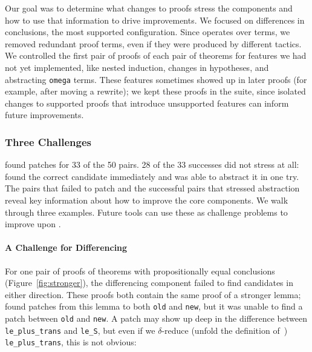 Our goal was to determine what changes to proofs stress the components
and how to use that information to drive improvements.
We focused on differences in conclusions, the most supported configuration.
Since \sysname operates over terms,
we removed redundant proof terms, even if they were produced by different tactics.
We controlled the first pair of proofs of each pair of theorems for features we had not yet implemented,
like nested induction, changes in hypotheses, and abstracting \lstinline{omega} terms.
These features sometimes showed up in later proofs (for example, after moving a rewrite);
we kept these proofs in the suite, since isolated changes to supported proofs that
introduce unsupported features can inform future improvements.	

\subsubsection{Three Challenges}
\label{sec:fail}

\sysname found patches for 33 of the 50 pairs. 28 of the 33 successes
did not stress \sysname at all: \sysname found the correct candidate immediately and was able to abstract it
in one try.
The pairs that \sysname failed to patch and the successful pairs that stressed abstraction
reveal key information about how to improve the core components.
We walk through three examples.
Future tools can use these as challenge problems to improve upon \sysname.

\paragraph{A Challenge for Differencing} For one pair of proofs of theorems 
with propositionally equal conclusions (Figure~\ref{fig:stronger}),
the differencing component failed to find candidates in either direction.
These proofs both contain the same proof of a stronger lemma;
\sysname found patches from this lemma to
both \lstinline{old} and \lstinline{new},
but it was unable to find a patch between \lstinline{old} and \lstinline{new}.
A patch may show up deep in the difference between \lstinline{le_plus_trans}
and \lstinline{le_S}, but even if we $\delta$-reduce (unfold the definition of~\cite{equality}) \lstinline{le_plus_trans}, this is not obvious:

